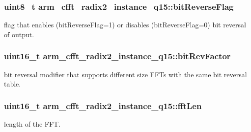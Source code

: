 \subsubsection[{\texorpdfstring{bit\+Reverse\+Flag}{bitReverseFlag}}]{\setlength{\rightskip}{0pt plus 5cm}uint8\+\_\+t arm\+\_\+cfft\+\_\+radix2\+\_\+instance\+\_\+q15\+::bit\+Reverse\+Flag}\hypertarget{structarm__cfft__radix2__instance__q15_af8300c1f60caa21e6b44b9240ab5af19}{}\label{structarm__cfft__radix2__instance__q15_af8300c1f60caa21e6b44b9240ab5af19}
flag that enables (bit\+Reverse\+Flag=1) or disables (bit\+Reverse\+Flag=0) bit reversal of output. 
\subsubsection[{\texorpdfstring{bit\+Rev\+Factor}{bitRevFactor}}]{\setlength{\rightskip}{0pt plus 5cm}uint16\+\_\+t arm\+\_\+cfft\+\_\+radix2\+\_\+instance\+\_\+q15\+::bit\+Rev\+Factor}\hypertarget{structarm__cfft__radix2__instance__q15_a8722720c542cabd41df83fe88ef4f4cb}{}\label{structarm__cfft__radix2__instance__q15_a8722720c542cabd41df83fe88ef4f4cb}
bit reversal modifier that supports different size F\+F\+Ts with the same bit reversal table. 
\subsubsection[{\texorpdfstring{fft\+Len}{fftLen}}]{\setlength{\rightskip}{0pt plus 5cm}uint16\+\_\+t arm\+\_\+cfft\+\_\+radix2\+\_\+instance\+\_\+q15\+::fft\+Len}\hypertarget{structarm__cfft__radix2__instance__q15_a874085647351dcf3f0de39d2b1d49744}{}\label{structarm__cfft__radix2__instance__q15_a874085647351dcf3f0de39d2b1d49744}
length of the F\+FT. 
